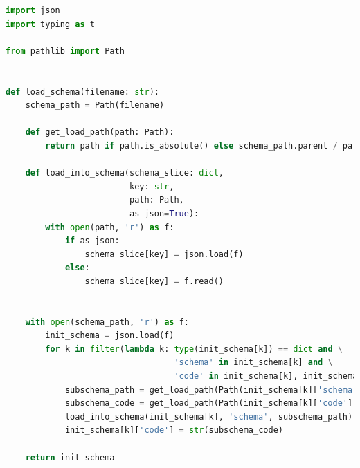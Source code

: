 \begin{lstlisting}[language={Python},basicstyle=\tiny,stepnumber=1,caption={Парсер схемы},label={lst:schema_parser.py}]
import json
import typing as t

from pathlib import Path


def load_schema(filename: str):
    schema_path = Path(filename)

    def get_load_path(path: Path):
        return path if path.is_absolute() else schema_path.parent / path

    def load_into_schema(schema_slice: dict,
                         key: str,
                         path: Path,
                         as_json=True):
        with open(path, 'r') as f:
            if as_json:
                schema_slice[key] = json.load(f)
            else:
                schema_slice[key] = f.read()


    with open(schema_path, 'r') as f:
        init_schema = json.load(f)
        for k in filter(lambda k: type(init_schema[k]) == dict and \
                                  'schema' in init_schema[k] and \
                                  'code' in init_schema[k], init_schema):
            subschema_path = get_load_path(Path(init_schema[k]['schema']))
            subschema_code = get_load_path(Path(init_schema[k]['code']))
            load_into_schema(init_schema[k], 'schema', subschema_path)
            init_schema[k]['code'] = str(subschema_code)

    return init_schema
\end{lstlisting}
